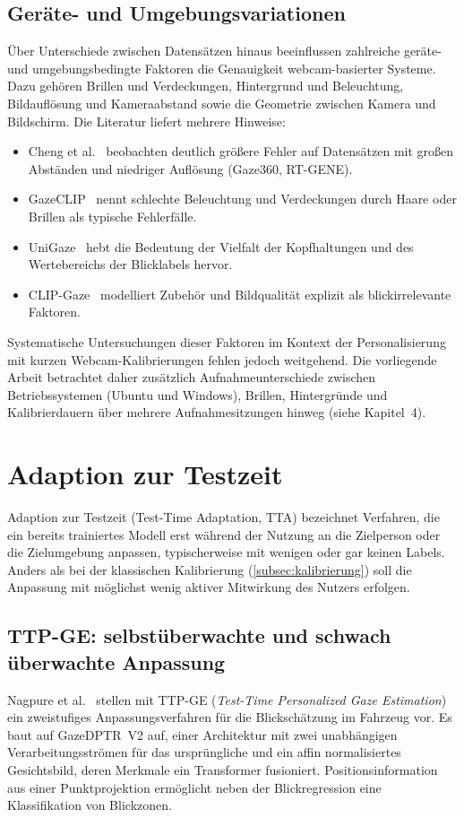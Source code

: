 \documentclass[
  11pt,
  a4paper,
  oneside,
  DIV=12,                 %
  BCOR=8mm,               %
  parskip=half,           %
  headings=normal,
  bibliography=totoc,     %
  listof=totoc            %
]{scrreprt}
\begin{document}
\subsection{Geräte- und Umgebungsvariationen}
\label{subsec:geraete}
Über Unterschiede zwischen Datensätzen hinaus beeinflussen zahlreiche geräte- und umgebungsbedingte Faktoren die Genauigkeit webcam-basierter Systeme. Dazu gehören Brillen und Verdeckungen, Hintergrund und Beleuchtung, Bildauflösung und Kameraabstand sowie die Geometrie zwischen Kamera und Bildschirm. Die Literatur liefert mehrere Hinweise:
\begin{itemize}
  \item Cheng et al.~\cite{cheng2024review} beobachten deutlich größere Fehler auf Datensätzen mit großen Abständen und niedriger Auflösung (Gaze360, RT-GENE).
  \item GazeCLIP~\cite{wang2026gazeclip} nennt schlechte Beleuchtung und Verdeckungen durch Haare oder Brillen als typische Fehlerfälle.
  \item UniGaze~\cite{qin2026unigaze} hebt die Bedeutung der Vielfalt der Kopfhaltungen und des Wertebereichs der Blicklabels hervor.
  \item CLIP-Gaze~\cite{yin2024clipgaze} modelliert Zubehör und Bildqualität explizit als blickirrelevante Faktoren.
\end{itemize}
Systematische Untersuchungen dieser Faktoren im Kontext der Personalisierung mit kurzen Webcam-Kalibrierungen fehlen jedoch weitgehend. Die vorliegende Arbeit betrachtet daher zusätzlich Aufnahmeunterschiede zwischen Betriebssystemen (Ubuntu und Windows), Brillen, Hintergründe und Kalibrierdauern über mehrere Aufnahmesitzungen hinweg (siehe Kapitel~4).

\section{Adaption zur Testzeit}
\label{sec:tta}
Adaption zur Testzeit (Test-Time Adaptation, TTA) bezeichnet Verfahren, die ein bereits trainiertes Modell erst während der Nutzung an die Zielperson oder die Zielumgebung anpassen, typischerweise mit wenigen oder gar keinen Labels. Anders als bei der klassischen Kalibrierung (\cref{subsec:kalibrierung}) soll die Anpassung mit möglichst wenig aktiver Mitwirkung des Nutzers erfolgen.

\subsection{TTP-GE: selbstüberwachte und schwach überwachte Anpassung}
\label{subsec:ttpge}
Nagpure et al.~\cite{nagpure2025ttpge} stellen mit TTP-GE (\emph{Test-Time Personalized Gaze Estimation}) ein zweistufiges Anpassungsverfahren für die Blickschätzung im Fahrzeug vor. Es baut auf GazeDPTR~V2 auf, einer Architektur mit zwei unabhängigen Verarbeitungsströmen für das ursprüngliche und ein affin normalisiertes Gesichtsbild, deren Merkmale ein Transformer fusioniert. Positionsinformation aus einer Punktprojektion ermöglicht neben der Blickregression eine Klassifikation von Blickzonen.
\end{document}
